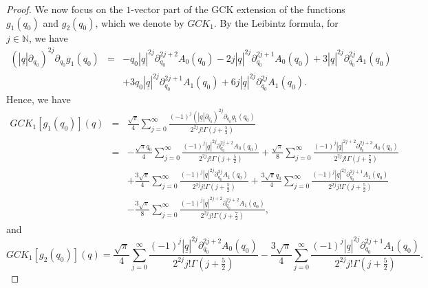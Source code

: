 \documentclass[10pt,a4paper]{amsart}
\begin{document}
\begin{proof}
We now focus on the $1$-vector part of the GCK extension of the functions $g_1(q_0)$ and $g_2(q_0)$, which we denote by $GCK_1$. By the Leibintz formula, for $j \in \mathbb{N}$, we have
\begin{eqnarray*}
(|\underline{q}| \partial_{q_0})^{2j} \partial_{q_0} g_1(q_0)&=&-q_0 | \underline{q}|^{2j} \partial_{q_0}^{2j+2} A_0(q_0)-2j |\underline{q}|^{2j} \partial_{q_0}^{2j+1}A_0(q_0)+3 | \underline{q}|^{2 j} \partial_{q_0}^{2j}A_1(q_0)\\
&&+3 q_0 | \underline{q}|^{2j} \partial_{q_0}^{2j+1}A_1(q_0)+6j | \underline{q}|^{2j} \partial_{q_0}^{2j} A_1(q_0).
\end{eqnarray*}
Hence, we have
\begin{eqnarray}
	\nonumber
GCK_1[g_1(q_0)](q)&=& \frac{\sqrt{\pi}}{4} \sum_{j=0}^\infty \frac{(-1)^j (|\underline{q}| \partial_{q_0})^{2j} \partial_{q_0} g_1(q_0)}{2^{2j}j! \Gamma \left(j+\frac{5}{2}\right)}\\
\nonumber
&=&- \frac{\sqrt{\pi}q_0}{4} \sum_{j=0}^\infty \frac{(-1)^j | \underline{q}|^{2j} \partial_{q_0}^{2j+2}A_0(q_0)}{2^{2j}j! \Gamma \left(j+\frac{5}{2}\right)}+ \frac{\sqrt{\pi}}{8} \sum_{j=0}^\infty \frac{(-1)^j | \underline{q}|^{2j+2} \partial_{q_0}^{2j+3}A_0(q_0)}{2^{2j} j! \Gamma \left(j+\frac{7}{2}\right)}\\
\nonumber
&&+ \frac{3 \sqrt{\pi}}{4} \sum_{j=0}^\infty \frac{(-1)^j | \underline{q}|^{2j} \partial_{q_0}^{2j}A_1(q_0)}{2^{2j}j! \Gamma \left(j+\frac{5}{2}\right)}+ \frac{3 \sqrt{\pi} q_0}{4} \sum_{j=0}^\infty \frac{(-1)^j| \underline{q}|^{2j} \partial_{q_0}^{2j+1}A_1(q_0)}{2^{2j}j! \Gamma \left(j+\frac{5}{2}\right)}\\
\label{p4}
&&-\frac{3\sqrt{\pi}}{8} \sum_{j=0}^\infty \frac{(-1)^j | \underline{q}|^{2j+2} \partial_{q_0}^{2j+2}A_1(q_0)}{2^{2j}j! \Gamma \left(j+\frac{7}{2}\right)},
\end{eqnarray}
and
\begin{equation}
\label{p5}
GCK_1[g_2(q_0)](q)= \frac{\sqrt{\pi}}{4} \sum_{j=0}^\infty \frac{(-1)^j |\underline{q}|^{2j} \partial_{q_0}^{2j+2}A_0(q_0)}{2^{2j}j!\Gamma \left(j+\frac{5}{2}\right)}- \frac{3 \sqrt{ \pi}}{4} \sum_{j=0}^{\infty} \frac{(-1)^j | \underline{q}|^{2j} \partial_{q_0}^{2j+1}A_1(q_0)}{2^{2j} j! \Gamma \left(j+ \frac{5}{2}\right)}.
\end{equation}


\end{proof}
\end{document}
